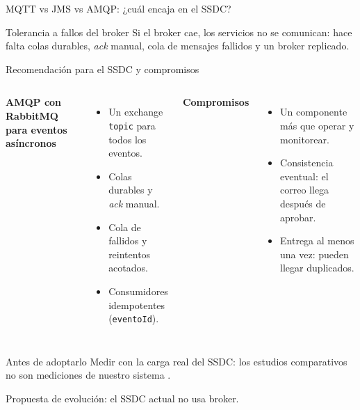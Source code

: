 \begin{frame}{MQTT vs JMS vs AMQP: ¿cuál encaja en el SSDC?}
\small
\begin{center}
\renewcommand{\arraystretch}{1.25}
\end{center}
\begin{block}{Tolerancia a fallos del broker}
\small Si el broker cae, los servicios no se comunican: hace falta colas durables, \textit{ack} manual, cola de mensajes fallidos y un broker replicado.
\end{block}
\end{frame}

\begin{frame}{Recomendación para el SSDC y compromisos}
\footnotesize
\begin{columns}[T,onlytextwidth]
\textbf{AMQP con RabbitMQ para eventos asíncronos}
\begin{itemize}
  \item Un exchange \texttt{topic} para todos los eventos.
  \item Colas durables y \textit{ack} manual.
  \item Cola de fallidos y reintentos acotados.
  \item Consumidores idempotentes (\texttt{eventoId}).
\end{itemize}
\textbf{Compromisos}
\begin{itemize}
  \item Un componente más que operar y monitorear.
  \item Consistencia eventual: el correo llega después de aprobar.
  \item Entrega al menos una vez: pueden llegar duplicados.
\end{itemize}
\end{columns}
\begin{block}{Antes de adoptarlo}
\footnotesize Medir con la carga real del SSDC: los estudios comparativos no son mediciones de nuestro sistema \cite{maharjan2023}.
\end{block}
{\scriptsize\color{gris}Propuesta de evolución: el SSDC actual no usa broker.}
\end{frame}

